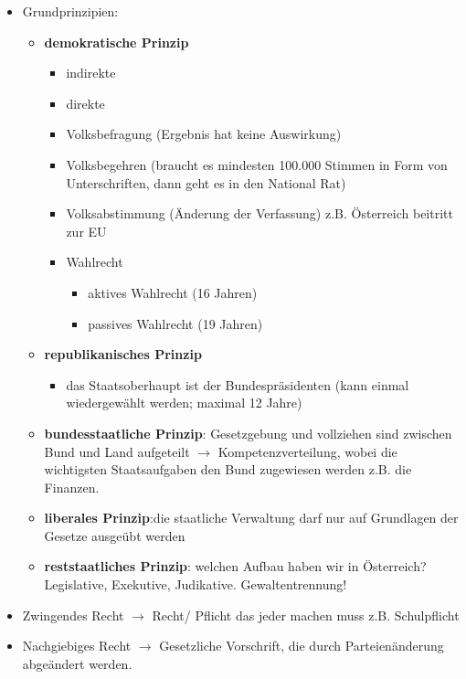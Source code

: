 \documentclass[a4paper]{report}
\begin{document}
\begin{itemize}
\item Grundprinzipien:

	\begin{itemize}
	\item \textbf{demokratische Prinzip}
	
			\begin{itemize}
			\item indirekte
			\item direkte
			\item Volksbefragung (Ergebnis hat keine Auswirkung)
			\item Volksbegehren (braucht es mindesten 100.000 Stimmen in Form von Unterschriften, dann geht es in den National Rat)
			\item Volksabstimmung (Änderung der Verfassung) z.B. Österreich beitritt zur EU
			
			\item Wahlrecht
				\begin{itemize}
				\item aktives Wahlrecht (16 Jahren)
				\item passives Wahlrecht (19 Jahren)
				\end{itemize}		
			\end{itemize}				
	
	\item \textbf{republikanisches Prinzip}
	
		\begin{itemize}
		\item das Staatsoberhaupt ist der Bundespräsidenten (kann einmal wiedergewählt werden; maximal 12 Jahre)
		\end{itemize}			
	\item \textbf{bundesstaatliche Prinzip}: Gesetzgebung und vollziehen sind zwischen Bund und Land aufgeteilt $\rightarrow$ Kompetenzverteilung, wobei die wichtigsten Staatsaufgaben den Bund zugewiesen werden z.B. die Finanzen.
	\item \textbf{liberales Prinzip}:die staatliche Verwaltung darf nur auf Grundlagen der Gesetze ausgeübt werden
	\item \textbf{reststaatliches Prinzip}: welchen Aufbau haben wir in Österreich? Legislative, Exekutive, Judikative. Gewaltentrennung!
	\end{itemize}
\end{itemize}

\begin{itemize}
\item Zwingendes Recht $\rightarrow$ Recht/ Pflicht das jeder machen muss z.B. Schulpflicht

\item Nachgiebiges Recht $\rightarrow$ Gesetzliche Vorschrift, die durch Parteienänderung abgeändert werden.

\end{itemize}
\end{document}
